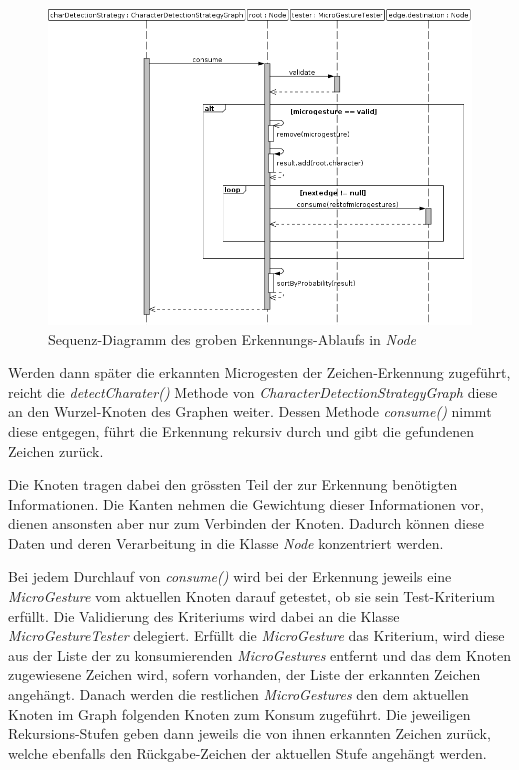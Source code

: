 \begin{figure}[h!]
   \centering
   \includegraphics[width=\textwidth]{img/uml_sd_consume} 
   \caption{Sequenz-Diagramm des groben Erkennungs-Ablaufs in \emph{Node}}
   \label{fig:sd_consume}
\end{figure}

Werden dann später die erkannten Microgesten der Zeichen-Erkennung zugeführt, reicht die \emph{detectCharater()} Methode von \emph{CharacterDetectionStrategyGraph} diese an den Wurzel-Knoten des Graphen weiter. Dessen Methode \emph{consume()} nimmt diese entgegen, führt die Erkennung rekursiv durch und gibt die gefundenen Zeichen zurück.

Die Knoten tragen dabei den grössten Teil der zur Erkennung benötigten Informationen. Die Kanten nehmen die Gewichtung dieser Informationen vor, dienen ansonsten aber nur zum Verbinden der Knoten. Dadurch können diese Daten und deren Verarbeitung in die Klasse \emph{Node} konzentriert werden. 

Bei jedem Durchlauf von \emph{consume()} wird bei der Erkennung jeweils eine \emph{MicroGesture} vom aktuellen Knoten darauf getestet, ob sie sein Test-Kriterium erfüllt. Die Validierung des Kriteriums wird dabei an die Klasse \emph{MicroGestureTester} delegiert. Erfüllt die \emph{MicroGesture} das Kriterium, wird diese aus der Liste der zu konsumierenden \emph{MicroGestures} entfernt und das dem Knoten zugewiesene Zeichen wird, sofern vorhanden, der Liste der erkannten Zeichen angehängt. Danach werden die restlichen \emph{MicroGestures} den dem aktuellen Knoten im Graph folgenden Knoten zum Konsum zugeführt. Die jeweiligen Rekursions-Stufen geben dann jeweils die von ihnen erkannten Zeichen zurück, welche ebenfalls den Rückgabe-Zeichen der aktuellen Stufe angehängt werden.

